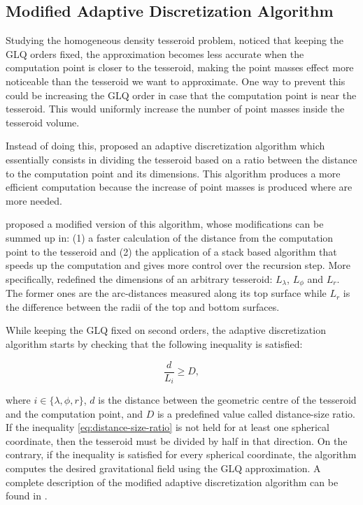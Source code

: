 \documentclass[extra]{gji}
\begin{document}
\subsection{Modified Adaptive Discretization Algorithm}

Studying the homogeneous density tesseroid problem, \citet{Ku1977} 
noticed that keeping the GLQ orders fixed, the approximation 
becomes less accurate when the computation point is closer to the 
tesseroid, making the point masses effect more noticeable than the 
tesseroid we want to approximate.
One way to prevent this could be increasing the GLQ order in case that 
the computation point is near the tesseroid.
This would uniformly increase the number of point masses inside the 
tesseroid volume.

Instead of doing this, \citet{Li2011} proposed an adaptive 
discretization algorithm which essentially consists in dividing the 
tesseroid based on a ratio between the distance to the computation 
point and its dimensions.
This algorithm produces a more efficient computation because the 
increase of point masses is produced where are more needed.

\citet{Uieda2016} proposed a modified version of this algorithm, whose
modifications can be summed up in:
(1) a faster calculation of the distance from the computation point to 
the tesseroid and 
(2) the application of a stack based algorithm that speeds up the 
computation and gives more control over the recursion step.
More specifically, \citet{Uieda2016} redefined the dimensions of an 
arbitrary tesseroid: $L_\lambda$, $L_\phi$ and $L_r$. The former ones 
are the arc-distances measured along its top surface while $L_r$ is the 
difference between the radii of the top and bottom surfaces.

While keeping the GLQ fixed on second orders, the adaptive 
discretization algorithm starts by checking that the following 
inequality is satisfied:

\begin{equation}
    \frac{d}{L_i} \geq D,
\label{eq:distance-size-ratio}
\end{equation}

\noindent where $i \in \{\lambda, \phi, r\}$, $d$ is the distance 
between the geometric centre of the tesseroid and the computation 
point, and $D$ is a predefined value called distance-size ratio.
If the inequality \ref{eq:distance-size-ratio} is not held for at least 
one spherical coordinate, then the tesseroid must be divided by half in 
that direction.
On the contrary, if the inequality is satisfied for every spherical 
coordinate, the algorithm computes the desired gravitational field using the 
GLQ approximation.
A complete description of the modified adaptive discretization 
algorithm can be found in \citet{Uieda2016}.
\end{document}
